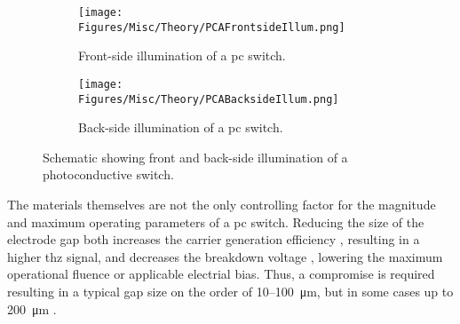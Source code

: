 \begin{figure}
\begin{subfigure}{0.49\textwidth}
    \centering
    \texttt{[image: Figures/Misc/Theory/PCAFrontsideIllum.png]}
    \caption{Front\nobreakdash-side illumination of a \acrshort{pc} switch.}
    \label{fig:fsillum}
\end{subfigure}
\begin{subfigure}{0.49\textwidth}
    \centering
    \texttt{[image: Figures/Misc/Theory/PCABacksideIllum.png]}
    \caption{Back\nobreakdash-side illumination of a \acrshort{pc} switch.}
    \label{fig:bsillum}
\end{subfigure}
\captionsetup{font = footnotesize, justification = centering}
\caption[Schematic showing Front and Back-Side Illumination of a Photoconductive Switch]{Schematic showing front and back-side illumination of a photoconductive switch.}
\label{fig:backandfrontillumination}
\end{figure}

The materials themselves are not the only controlling factor for the magnitude and maximum operating parameters of a \acrshort{pc} switch. Reducing the size of the electrode gap both increases the carrier generation efficiency \DIFdelbegin \DIFdel{~}\DIFdelend \cite{Tani2002}, resulting in a higher \acrshort{thz} signal, and decreases the breakdown voltage \DIFdelbegin \DIFdel{~}\DIFdelend \cite{Stone2004}, lowering the maximum operational fluence or applicable electrial bias. Thus, a compromise is required resulting in a typical gap size on the order of 10\nobreakdash--\SI{100}{\micro\metre}, but in some cases up to \SI{200}{\micro\metre} \DIFdelbegin \DIFdel{~}\DIFdelend \cite{Bacon2017}. 

